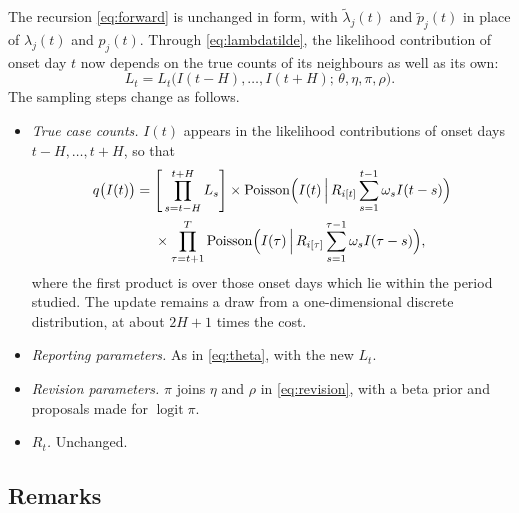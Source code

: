 \documentclass[11pt,a4paper]{article}
\newcommand{\pois}{\operatorname{Poisson}}
\begin{document}
The recursion \eqref{eq:forward} is unchanged in form, with $\tilde\lambda_j(t)$
and $\tilde p_j(t)$ in place of $\lambda_j(t)$ and $p_j(t)$. Through
\eqref{eq:lambdatilde}, the likelihood contribution of onset day $t$ now
depends on the true counts of its neighbours as well as its own:
\begin{equation}
L_t = L_t\bigl(I(t-H),\dots,I(t+H);\,\theta,\eta,\pi,\rho\bigr).
\end{equation}
The sampling steps change as follows.
\begin{itemize}[itemsep=2pt]
\item \emph{True case counts.} $I(t)$ appears in the likelihood contributions
of onset days $t-H,\dots,t+H$, so that
\begin{equation}
\begin{aligned}
q\bigl(I(t)\bigr) ={}& \Biggl[\,\prod_{s=t-H}^{t+H}L_s\Biggr]
\times \pois\Bigl(I(t)\,\Big|\, R_{i[t]}\sum_{s=1}^{t-1}\omega_s I(t-s)\Bigr) \\
&\times \prod_{\tau=t+1}^{T}\pois\Bigl(I(\tau)\,\Big|\, R_{i[\tau]}\sum_{s=1}^{\tau-1}\omega_s I(\tau-s)\Bigr),
\end{aligned}
\end{equation}
where the first product is over those onset days which lie within the period
studied. The update remains a draw from a one-dimensional discrete
distribution, at about $2H+1$ times the cost.
\item \emph{Reporting parameters.} As in \eqref{eq:theta}, with the new $L_t$.
\item \emph{Revision parameters.} $\pi$ joins $\eta$ and $\rho$ in
\eqref{eq:revision}, with a beta prior and proposals made for
$\operatorname{logit}\pi$.
\item \emph{$R_t$.} Unchanged.
\end{itemize}

\subsection{Remarks}
\end{document}
